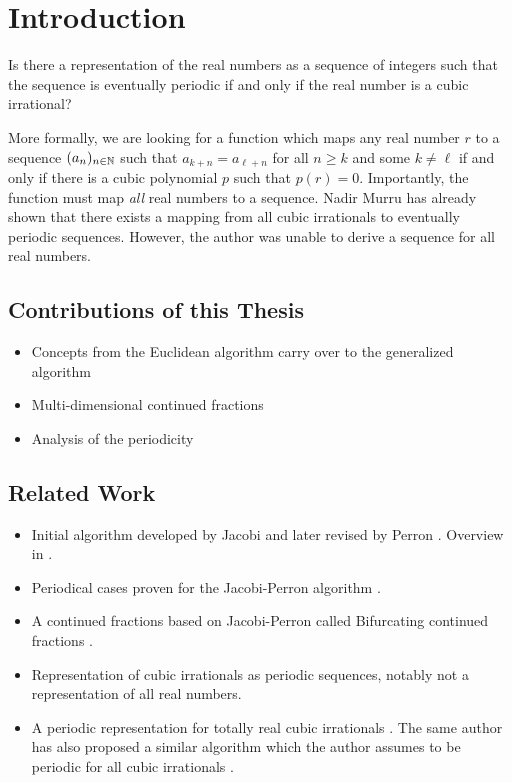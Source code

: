 \chapter{Introduction}

\begin{problem}
  Is there a representation of the real numbers as a sequence of integers such
  that the sequence is eventually periodic if and only if the real number is a
  cubic irrational?
\end{problem}

More formally, we are looking for a function which maps any real number $r$ to
a sequence $(a_n)_{n \in {\mathbb N}}$ such that $a_{k+n} = a_{\ell+n}$ for all $n \ge k$ and
some $k \ne \ell$ if and only if there is a cubic polynomial $p$ such that $p(r) = 0$.
Importantly, the function must map \emph{all} real numbers to a sequence.
Nadir Murru \cite{Murru15} has already shown that there exists a mapping from all
cubic irrationals to eventually periodic sequences.
However, the author was unable to derive a sequence for all real numbers.

\section{Contributions of this Thesis}

\begin{itemize}
  \item Concepts from the Euclidean algorithm carry over to the generalized algorithm
  \item Multi-dimensional continued fractions
  \item Analysis of the periodicity
\end{itemize}

\section{Related Work}

\begin{itemize}
  \item Initial algorithm developed by Jacobi \cite{Jacobi68} and later revised
    by Perron \cite{Perron07}. Overview in \cite{Bernstein71}.
  \item
    Periodical cases proven for the Jacobi-Perron algorithm \cite{Bernstein64}.
  \item
    A continued fractions based on Jacobi-Perron called Bifurcating continued
    fractions \cite{Gupta00}.
  \item
    Representation of cubic irrationals as periodic sequences, notably not a representation of all real numbers. \cite{Murru15}
  \item
    A periodic representation for totally real cubic irrationals \cite{Karpenkov24}.
    The same author has also proposed a similar algorithm which the author
    assumes to be periodic for all cubic irrationals \cite{Karpenkov21}.
\end{itemize}

